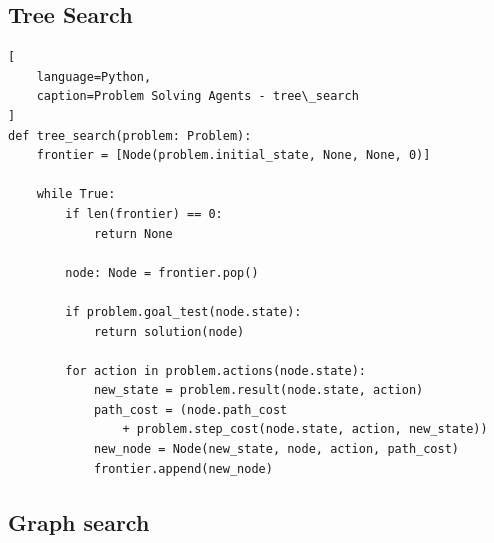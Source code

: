 \subsection{Tree Search}
\vspace{0.2cm}

\begin{algorithm}[H]
    \caption{An informal description of the general tree-search algorithm. \cite{ai/book/Artificial-Intelligence-A-Modern-Approach/Russell-Norvig}}

\end{algorithm}


\begin{lstlisting}[
    language=Python,
    caption=Problem Solving Agents - tree\_search
]
def tree_search(problem: Problem):
    frontier = [Node(problem.initial_state, None, None, 0)]

    while True:
        if len(frontier) == 0:
            return None

        node: Node = frontier.pop()

        if problem.goal_test(node.state):
            return solution(node)

        for action in problem.actions(node.state):
            new_state = problem.result(node.state, action)
            path_cost = (node.path_cost
                + problem.step_cost(node.state, action, new_state))
            new_node = Node(new_state, node, action, path_cost)
            frontier.append(new_node)
\end{lstlisting}




\subsection{Graph search}
\vspace{0.2cm}

